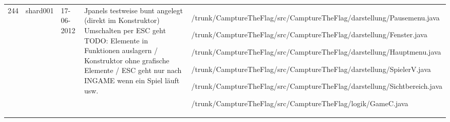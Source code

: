 \begin{longtable}{l l l p{80px} p{80px}}
	  244 &
		  shard001
		  &
		  17-06-2012
		  &
		  Jpanels testweise bunt angelegt (direkt im Konstruktor)
Umschalten per ESC geht
TODO: Elemente in Funktionen auslagern / Konstruktor ohne grafische Elemente / ESC geht nur nach INGAME wenn ein Spiel läuft usw.
		  & \strut
		  /trunk/CamptureTheFlag/src/CamptureTheFlag/darstellung/Pausemenu.java \par /trunk/CamptureTheFlag/src/CamptureTheFlag/darstellung/Fenster.java \par /trunk/CamptureTheFlag/src/CamptureTheFlag/darstellung/Hauptmenu.java \par /trunk/CamptureTheFlag/src/CamptureTheFlag/darstellung/SpielerV.java \par /trunk/CamptureTheFlag/src/CamptureTheFlag/darstellung/Sichtbereich.java \par /trunk/CamptureTheFlag/src/CamptureTheFlag/logik/GameC.java \par  \strut \\
	  
  \end{longtable}
  